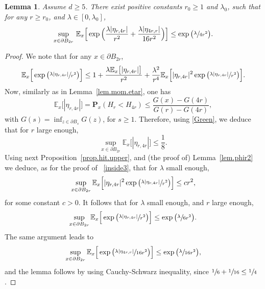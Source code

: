 \documentclass[11pt]{article}
\numberwithin{equation}{section}
\theoremstyle{plain}
\newtheorem{lemma}[theorem]{Lemma}
\theoremstyle{definition}
\newcommand{\1}{{\text{\Large $\mathfrak 1$}}}
\begin{document}
\begin{lemma}\label{lem.phir3}
Assume $d\ge 5$.
There exist positive constants $r_0\ge 1$ and $\lambda_0$, such that for any $r\ge r_0$, and $\lambda\in[0,\lambda_0]$,
\[
\sup_{x\in \partial B_{2r}} \, \mathbb E_x \Big[\exp\Big(\frac{\lambda |\eta_{r,4r}|}{r^2} + \frac{\lambda |\eta_{4r,r}|}{16r^2}\Big)\Big]
\le \exp\big(\sfrac{\lambda}{4r^2}\big).
\]
\end{lemma}
\begin{proof}

We note that for any $x\in \partial B_{2r}$,
\[
\mathbb E_x\Big[\exp\big(\sfrac{\lambda |\eta_{r,4r}|}{r^2}\big)\Big] \le 1+ \frac{\lambda \mathbb E_x\big[|\eta_{r,4r}|\big]}{r^2} +
\frac{\lambda^2}{r^4} \mathbb E_x\Big[|\eta_{r,4r}|^2\exp\big(\sfrac{\lambda |\eta_{r,4r}|}{r^2}\big)\Big].
\]
Now, similarly as in Lemma~\ref{lem.mom.etar}, one has
\[
\mathbb E_x\big[|\eta_{r,4r}|\big] = \mathbf P_x(H_r<H_{4r}) \le \frac{G(x) - G(4r)}{G(r)- G(4r)},
\]
with $G(s)= \inf_{z\in \partial B_s} G(z)$, for $s\ge 1$. Therefore, using \eqref{Green}, we deduce that for $r$ large enough,
\[
\sup_{x\in \partial B_{2r}} \mathbb E_x\big[|\eta_{r,4r}|\big] \le \frac{1}{8}.
\]
Using next Proposition~\ref{prop.hit.upper}, and (the proof of) Lemma~\ref{lem.phir2} we deduce, as for the proof of ~\eqref{inside3}, that for $\lambda$ small enough,
\[
\sup_{x\in \partial B_{2r}} \mathbb E_x\Big[|\eta_{r,4r}|^2\exp\big(\sfrac{\lambda |\eta_{r,4r}|}{r^2}\big)\Big] \le c r^2,
\]
for some constant $c>0$. It follows that for $\lambda$ small enough, and $r$ large enough,
\[
\sup_{x\in \partial B_{2r}} \mathbb E_x\Big[\exp\big(\sfrac{\lambda |\eta_{r,4r}|}{r^2}\big)\Big] \le \exp\big(\sfrac{\lambda}{6r^2}\big).
\]
The same argument leads to
\[
\sup_{x\in \partial B_{2r}} \mathbb E_x\Big[\exp\big(\sfrac{\lambda |\eta_{4r,r}|}{16r^2}\big)\Big] \le \exp\big(\sfrac{\lambda}{16r^2}\big),
\]
and the lemma follows by using Cauchy-Schwarz inequality, since $\sfrac{1}{6} + \sfrac{1}{16} \le \sfrac 14$.
\end{proof}
\end{document}
